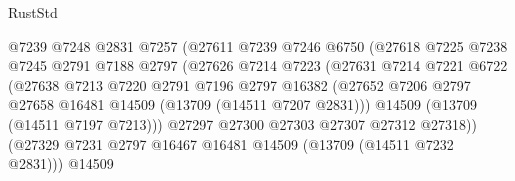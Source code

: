 \begin{lexlean}{RustStd}
\begin{coremodule}
                                    @7239
                                    @7248
                                    @2831
                                    @7257
                                    (@27611
                                      @7239
                                      @7246
                                      @6750
                                      (@27618
                                        @7225
                                        @7238
                                        @7245
                                        @2791
                                        @7188
                                        @2797
                                        (@27626
                                          @7214
                                          @7223
                                          (@27631
                                            @7214
                                            @7221
                                            @6722
                                            (@27638
                                              @7213
                                              @7220
                                              @2791
                                              @7196
                                              @2797
                                              @16382
                                              (@27652
                                                @7206
                                                @2797
                                                @27658
                                                @16481
                                                @14509
                                                (@13709 (@14511 @7207 @2831)))
                                              @14509
                                              (@13709 (@14511 @7197 @7213)))
                                            @27297
                                            @27300
                                            @27303
                                            @27307
                                            @27312
                                            @27318))
                                        (@27329
                                          @7231
                                          @2797
                                          @16467
                                          @16481
                                          @14509
                                          (@13709 (@14511 @7232 @2831)))
                                        @14509

\end{coremodule}
\end{lexlean}
